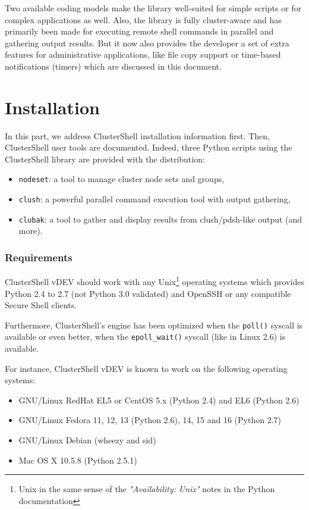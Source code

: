 \documentclass[english,a4paper]{csuserguide}
\providecommand{\version}{DEV}%
\newcommand{\nodeset}{\texttt{nodeset}\xspace}
\newcommand{\clush}{\texttt{clush}\xspace}
\newcommand{\clubak}{\texttt{clubak}\xspace}
\begin{document}
Two available coding models make the library well-suited for simple scripts or for complex applications as well. Also, the library is fully cluster-aware and has primarily been made for executing remote shell commands in parallel and gathering output results. But it now also provides the developer a set of extra features for administrative applications, like file copy support or time-based notifications (timers) which are discussed in this document.

\newpage
\part{Installation}

In this part, we address ClusterShell installation information first. Then, ClusterShell user tools are documented. Indeed, three Python scripts using the ClusterShell library are provided with the distribution:
\begin{itemize}
\item \nodeset: a tool to manage cluster node sets and groups,
\item \clush: a powerful parallel command execution tool with output gathering,
\item \clubak: a tool to gather and display results from clush/pdsh-like output (and more).
\end{itemize}


\section{Requirements}

ClusterShell v\version{} should work with any Unix\footnote{Unix in the same sense of the \textit{"Availability: Unix"} notes in the Python documentation} operating systems which provides Python 2.4 to 2.7 (not Python 3.0 validated) and OpenSSH or any compatible Secure Shell clients.

Furthermore, ClusterShell's engine has been optimized when the \verb+poll()+ syscall is available or even better, when the \verb+epoll_wait()+ syscall (like in Linux 2.6) is available.

For instance, ClusterShell v\version{} is known to work on the following operating systems:
\begin{itemize}
\item GNU/Linux RedHat EL5 or CentOS 5.x (Python 2.4) and EL6 (Python 2.6)
\item GNU/Linux Fedora 11, 12, 13 (Python 2.6), 14, 15 and 16 (Python 2.7)
\item GNU/Linux Debian (wheezy and sid)
\item Mac OS X 10.5.8 (Python 2.5.1)
\end{itemize}
\end{document}
